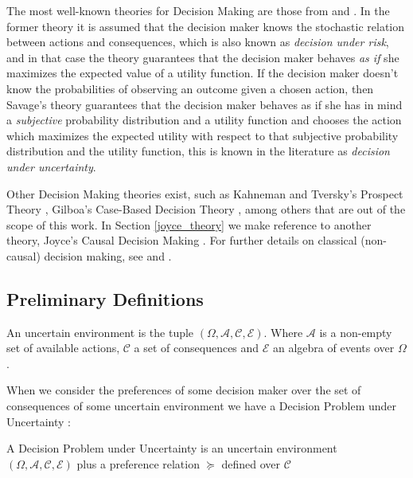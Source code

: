 \documentclass{svjour3}                     %
\begin{document}
The most well-known theories for Decision Making are those from \cite{von1944theory} and \cite{savage1954the}. In the former theory it is assumed that the decision maker knows the stochastic relation between actions and consequences, which is also known as \textit{decision under risk}, and in that case the theory guarantees that the decision maker behaves \textit{as if} she maximizes the expected value of a utility function. If the decision maker doesn't know the probabilities of observing an outcome given a chosen action, then Savage's theory guarantees that the decision maker behaves as if she has in mind a \textit{subjective} probability distribution and a utility function and chooses the action which maximizes the expected utility with respect to that subjective probability distribution and the utility function, this is known in the literature as \textit{decision under uncertainty}.

Other Decision Making theories exist, such as Kahneman and Tversky's Prospect Theory \citep{kahneman1979prospect}, Gilboa's Case-Based Decision Theory \citep{gilboa1995case}, among others that are out of the scope of this work. In Section \ref{joyce_theory} we make reference to another theory, Joyce's Causal Decision Making \citep{joyce1999foundations}. For further details on classical (non-causal) decision making, see \cite{bernardo2000bayesian} and \cite{gilboa2009decision}.

\subsection{Preliminary Definitions}
\label{definitions}
\begin{definition}
An uncertain environment is the tuple $(\Omega, \mathcal{A},\mathcal{C},\mathcal{E})$. Where $\mathcal{A}$ is a non-empty set of available actions, $\mathcal{C}$ a set of consequences and $\mathcal{E}$ an algebra of events over $\Omega$. 
\end{definition}

When we consider the preferences of some decision maker over the set of consequences of some uncertain environment we have a Decision Problem under Uncertainty \citep{bernardo2000bayesian}:

\begin{definition}
A Decision Problem under Uncertainty is an uncertain environment $(\Omega, \mathcal{A},\mathcal{C},\mathcal{E})$ plus a preference relation $\succeq$ defined over $\mathcal{C}$ 
\end{definition}
\end{document}
